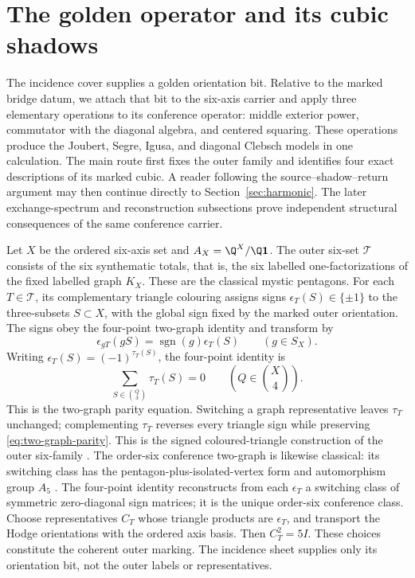 \section{The golden operator and its cubic shadows}
\label{sec:golden-operator}

The incidence cover supplies a golden orientation bit.  Relative to the
marked bridge datum, we attach that bit to the six-axis carrier and apply
three elementary operations to its
conference operator: middle exterior power, commutator with the diagonal
algebra, and centered squaring.  These operations produce the Joubert,
Segre, Igusa, and diagonal Clebsch models in one calculation.
The main route first fixes the outer family and identifies four exact
descriptions of its marked cubic.  A reader following the
source--shadow--return argument may then continue directly to
Section~\ref{sec:harmonic}.  The later exchange-spectrum and reconstruction
subsections prove independent structural consequences of the same conference
carrier.

Let \(X\) be the ordered six-axis set and
\(A_X=\Q^X/\Q\mathbf1\).  The outer six-set \(\mathcal T\) consists of the
six synthematic totals, that is, the six labelled one-factorizations of the
fixed labelled graph \(K_X\).
These are the classical mystic pentagons.  For each \(T\in\mathcal T\), its
complementary triangle colouring assigns signs
\(\epsilon_T(S)\in\{\pm1\}\) to the three-subsets \(S\subset X\), with the
global sign fixed by the marked outer orientation.  The signs obey the
four-point two-graph identity and transform by
\[
 \epsilon_{gT}(gS)=\operatorname{sgn}(g)\epsilon_T(S)
 \qquad(g\in S_X).
\]
Writing \(\epsilon_T(S)=(-1)^{\tau_T(S)}\), the four-point identity is
\begin{equation}
 \label{eq:two-graph-parity}
 \sum_{S\in\binom Q3}\tau_T(S)=0
 \qquad\left(Q\in\binom X4\right).
\end{equation}
This is the two-graph parity equation.  Switching a graph representative
leaves \(\tau_T\) unchanged; complementing \(\tau_T\) reverses every triangle
sign while preserving \eqref{eq:two-graph-parity}.
This is the signed coloured-triangle construction of the outer six-family
\cite[Sections~1.1--1.2 and~1.6]{HMSVOuter}.
The order-six conference two-graph is likewise classical: its switching
class has the pentagon-plus-isolated-vertex form and automorphism group
\(A_5\) \cite{BMS}.
The four-point identity reconstructs from each \(\epsilon_T\) a switching
class of symmetric zero-diagonal sign matrices; it is the unique order-six
conference class.  Choose representatives \(C_T\) whose triangle products
are \(\epsilon_T\), and transport the Hodge orientations with the ordered
axis basis.  Then \(C_T^2=5I\).  These choices constitute the coherent outer
marking.  The incidence sheet supplies only its orientation bit, not the
outer labels or representatives.

